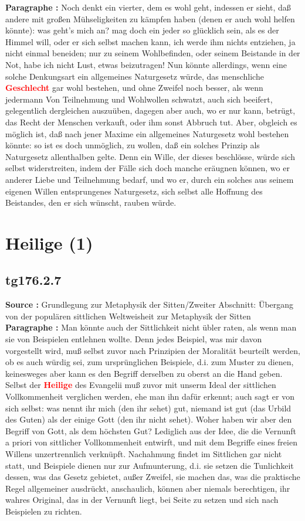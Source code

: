\documentclass[a4paper,12pt,twoside]{book}
\newcommand{\match}[1]{\textcolor{red}{\textbf{#1}}}
\newcommand{\unnumberedsection}[1]{
	\section*{#1}
	\addcontentsline{toc}{section}{#1}
	\markright{#1}
}
\begin{document}
	\noindent\textbf{Paragraphe : }Noch denkt ein vierter, dem es wohl geht, indessen er sieht, daß andere mit großen Mühseligkeiten zu kämpfen haben (denen er auch wohl helfen könnte): was geht's mich an? mag doch ein jeder so glücklich sein, als es der Himmel will, oder er sich selbst machen kann, ich werde ihm nichts entziehen, ja nicht einmal beneiden; nur zu seinem Wohlbefinden, oder seinem Beistande in der Not, habe ich nicht Lust, etwas beizutragen! Nun könnte allerdings, wenn eine solche Denkungsart ein allgemeines Naturgesetz würde, das menschliche \match{Geschlecht} gar wohl bestehen, und ohne Zweifel noch besser, als wenn jedermann Von Teilnehmung und Wohlwollen schwatzt, auch sich beeifert, gelegentlich dergleichen auszuüben, dagegen aber auch, wo er nur kann, betrügt, das Recht der Menschen verkauft, oder ihm sonst Abbruch tut. Aber, obgleich es möglich ist, daß nach jener Maxime ein allgemeines Naturgesetz wohl bestehen könnte: so ist es doch unmöglich, zu wollen, daß ein solches Prinzip als Naturgesetz allenthalben gelte. Denn ein Wille, der dieses beschlösse, würde sich selbst widerstreiten, indem der Fälle sich doch manche eräugnen können, wo er anderer Liebe und Teilnehmung bedarf, und wo er, durch ein solches aus seinem eigenen Willen entsprungenes Naturgesetz, sich selbst alle Hoffnung des Beistandes, den er sich wünscht, rauben würde. 
	
	\unnumberedsection{Heilige (1)} 
	\subsection*{tg176.2.7} 
	\textbf{Source : }Grundlegung zur Metaphysik der Sitten/Zweiter Abschnitt: Übergang von der populären sittlichen Weltweisheit zur Metaphysik der Sitten\\  
	
	\noindent\textbf{Paragraphe : }Man könnte auch der Sittlichkeit nicht übler raten, als wenn man sie von Beispielen entlehnen wollte. Denn jedes Beispiel, was mir davon vorgestellt wird, muß selbst zuvor nach Prinzipien der Moralität beurteilt werden, ob es auch würdig sei, zum ursprünglichen Beispiele, d.i. zum Muster zu dienen, keinesweges aber kann es den Begriff derselben zu oberst an die Hand geben. Selbst der \match{Heilige} des Evangelii muß zuvor mit unserm Ideal der sittlichen Vollkommenheit verglichen werden, ehe man ihn dafür erkennt; auch sagt er von sich selbst: was nennt ihr mich (den ihr sehet) gut, niemand ist gut (das Urbild des Guten) als der einige Gott (den ihr nicht sehet). Woher haben wir aber den Begriff von Gott, als dem höchsten Gut? Lediglich aus der Idee, die die Vernunft a priori von sittlicher Vollkommenheit entwirft, und mit dem Begriffe eines freien Willens unzertrennlich verknüpft. Nachahmung findet im Sittlichen gar nicht statt, und Beispiele dienen nur zur Aufmunterung, d.i. sie setzen die Tunlichkeit dessen, was das Gesetz gebietet, außer Zweifel, sie machen das, was die praktische Regel allgemeiner ausdrückt, anschaulich, können aber niemals  berechtigen, ihr wahres Original, das in der Vernunft liegt, bei Seite zu setzen und sich nach Beispielen zu richten. 
	
\end{document}
